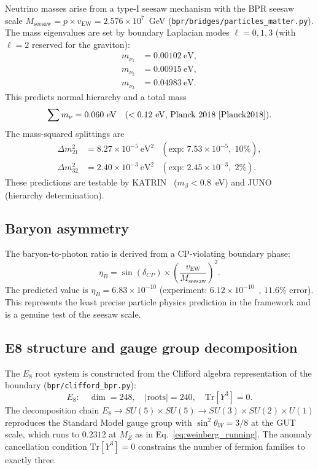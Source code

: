 \documentclass[aps,prd,twocolumn,superscriptaddress,longbibliography,nofootinbib]{revtex4-2}
\newcommand{\vEW}{v_{\mathrm{EW}}}
\newcommand{\sinW}{\sin^2\!\theta_W}
\newcommand{\MZ}{M_Z}
\begin{document}
Neutrino masses arise from a type-I seesaw mechanism with the BPR
seesaw scale $M_{\mathrm{seesaw}} = p \times \vEW = 2.576 \times
10^7$~GeV (\texttt{bpr/bridges/particles\_matter.py}).  The mass
eigenvalues are set by boundary Laplacian modes $\ell = 0, 1, 3$
(with $\ell = 2$ reserved for the graviton):
\begin{align}
m_{\nu_1} &= 0.00102~\text{eV}, \nonumber \\
m_{\nu_2} &= 0.00915~\text{eV}, \nonumber \\
m_{\nu_3} &= 0.04983~\text{eV}.
\label{eq:neutrino_masses}
\end{align}
This predicts normal hierarchy and a total mass
\begin{equation}
\sum m_\nu = 0.060~\text{eV} \quad (< 0.12~\text{eV, Planck
2018~\cite{Planck2018}}).
\label{eq:sum_mnu}
\end{equation}
The mass-squared splittings are
\begin{align}
\Delta m^2_{21} &= 8.27 \times 10^{-5}~\text{eV}^2
  &\!\!\!(\text{exp: } 7.53 \times 10^{-5},\; 10\%), \nonumber \\
\Delta m^2_{32} &= 2.40 \times 10^{-3}~\text{eV}^2
  &\!\!\!(\text{exp: } 2.45 \times 10^{-3},\; 2\%).
\label{eq:dm2}
\end{align}
These predictions are testable by KATRIN~\cite{KATRIN2022}
($m_\beta < 0.8$~eV) and JUNO~\cite{JUNO2022} (hierarchy
determination).

\subsection{Baryon asymmetry}

The baryon-to-photon ratio is derived from a CP-violating boundary
phase:
\begin{equation}
\eta_B = \sin(\delta_{CP}) \times
  \left(\frac{\vEW}{M_{\mathrm{seesaw}}}\right)^{\!2}.
\label{eq:etaB}
\end{equation}
The predicted value is $\eta_B = 6.83 \times 10^{-10}$ (experiment:
$6.12 \times 10^{-10}$~\cite{Planck2018}, $11.6\%$ error).  This
represents the least precise particle physics prediction in the
framework and is a genuine test of the seesaw scale.

\subsection{E8 structure and gauge group decomposition}

The $E_8$ root system is constructed from the Clifford algebra
representation of the boundary (\texttt{bpr/clifford\_bpr.py}):
\begin{equation}
E_8: \quad \dim = 248, \quad |\text{roots}| = 240, \quad
\mathrm{Tr}[Y^3] = 0.
\label{eq:e8}
\end{equation}
The decomposition chain $E_8 \to SU(5) \times SU(5) \to SU(3)
\times SU(2) \times U(1)$ reproduces the Standard Model gauge group
with $\sinW = 3/8$ at the GUT scale, which runs to $0.2312$ at
$\MZ$ as in Eq.~\eqref{eq:weinberg_running}.  The anomaly
cancellation condition $\mathrm{Tr}[Y^3] = 0$ constrains the number
of fermion families to exactly three.
\end{document}
